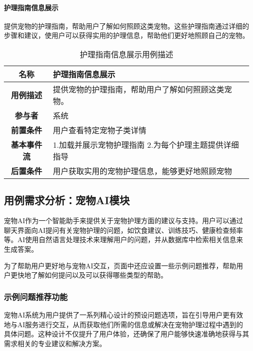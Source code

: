 \paragraph{护理指南信息展示}

提供宠物的护理指南，帮助用户了解如何照顾这类宠物。这些护理指南通过详细的步骤和建议，使用户可以获得实用的护理信息，帮助他们更好地照顾自己的宠物。

\begin{table}[H]
	\centering
	\caption{护理指南信息展示用例描述}
	\renewcommand\arraystretch{1.5}
	\begin{tabular}{|c|>{\raggedright\arraybackslash}p{10cm}|}
		\hline
		\textbf{名称} & \textbf{护理指南信息展示} \\ \hline
		\textbf{用例描述} & 提供宠物的护理指南，帮助用户了解如何照顾这类宠物。 \\ \hline
		\textbf{参与者} & 系统 \\ \hline
		\textbf{前置条件} & 用户查看特定宠物子类详情 \\ \hline
		\textbf{基本事件流} & 
		1.加载并展示宠物护理指南\newline
		2.为每个护理主题提供详细指导\\
		\hline
		\textbf{后置条件} & 用户获取实用的宠物护理信息，能够更好地照顾宠物 \\ \hline
	\end{tabular}
\end{table}

\subsection{用例需求分析：宠物AI模块}

宠物AI作为一个智能助手来提供关于宠物护理方面的建议与支持。用户可以通过聊天界面向AI提问有关宠物护理的问题，如饮食建议、训练技巧、健康检查频率等。AI使用自然语言处理技术来理解用户的问题，并从数据库中检索相关信息来生成答案。

为了帮助用户更好地与宠物AI交互，页面中还应设置一些示例问题推荐，帮助用户更快地了解如何提问以及可以获得哪些类型的帮助。

\subsubsection{示例问题推荐功能}

宠物AI系统为用户提供了一系列精心设计的预设问题选项，旨在引导用户更有效地与AI服务进行交互，从而获取他们所需的信息或解决在宠物护理过程中遇到的具体问题。这种设计不仅提升了用户体验，还确保了用户能够快速准确地获得与其需求相关的专业建议和解决方案。

